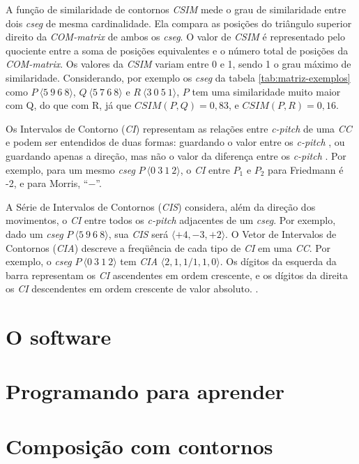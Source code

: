 \documentclass[brazil]{article}
\newcommand{\termo}[1]{\textit{#1}}
\begin{document}
A função de similaridade de contornos \termo{CSIM} mede o grau de
similaridade entre dois \termo{cseg} de mesma cardinalidade. Ela
compara as posições do triângulo superior direito da
\termo{COM-matrix} de ambos os \termo{cseg}. O valor de \termo{CSIM} é
representado pelo quociente entre a soma de posições equivalentes e o
número total de posições da \termo{COM-matrix}. Os valores da
\termo{CSIM} variam entre 0 e 1, sendo 1 o grau máximo de
similaridade. Considerando, por exemplo os \termo{cseg} da tabela
\ref{tab:matriz-exemplos} como $P\:\langle5\:9\:6\:8\rangle$,
$Q\:\langle5\:7\:6\:8\rangle$ e $R\:\langle3\:0\:5\:1\rangle$, $P$ tem
uma similaridade muito maior com Q, do que com R, já que
$CSIM(P,Q)=0,83$, e $CSIM(P,R)=0,16$.

Os Intervalos de Contorno (\termo{CI}) representam as relações entre
\termo{c-pitch} de uma \termo{CC} e podem ser entendidos de duas
formas: guardando o valor entre os \termo{c-pitch}
\cite{friedmann85:methodology}, ou guardando apenas a direção, mas não
o valor da diferença entre os \termo{c-pitch}
\cite{morris93:directions}. Por exemplo, para um mesmo \termo{cseg}
$P\:\langle0\:3\:1\:2\rangle$, o \termo{CI} entre $P_1$ e $P_2$ para
Friedmann é -2, e para Morris, ``$-$''.

A Série de Intervalos de Contornos (\termo{CIS}) considera, além da
direção dos movimentos, o \termo{CI} entre todos os \termo{c-pitch}
adjacentes de um \termo{cseg}. Por exemplo, dado um \termo{cseg}
$P\:\langle5\:9\:6\:8\rangle$, sua \termo{CIS} será
$\langle+4,-3,+2\rangle$. O Vetor de Intervalos de Contornos
(\termo{CIA}) descreve a freqüência de cada tipo de \termo{CI} em uma
\termo{CC}. Por exemplo, o \termo{cseg} $P\:\langle0\:3\:1\:2\rangle$
tem \termo{CIA} $\langle2,1,1/1,1,0\rangle$. Os dígitos da esquerda da
barra representam os \termo{CI} ascendentes em ordem crescente, e os
dígitos da direita os \termo{CI} descendentes em ordem crescente de
valor absoluto. \cite{friedmann85:methodology}.

\section{O software}
\label{sec:o-software}

\section{Programando para aprender}
\label{sec:progr-para-aprend}

\section{Composição com contornos}
\label{sec:comp-com-cont}
\end{document}
